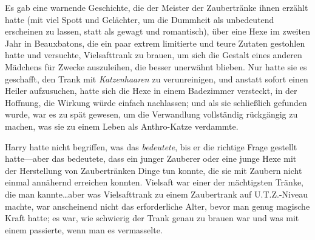 Es gab eine warnende Geschichte, die der Meister der Zaubertränke ihnen erzählt hatte (mit viel Spott und Gelächter, um die Dummheit als unbedeutend erscheinen zu lassen, statt als gewagt und romantisch), über eine Hexe im zweiten Jahr in Beauxbatons, die ein paar extrem limitierte und teure Zutaten gestohlen hatte und versuchte, Vielsafttrank zu brauen, um sich die Gestalt eines anderen Mädchens für Zwecke auszuleihen, die besser unerwähnt blieben. Nur hatte sie es geschafft, den Trank mit \emph{Katzenhaaren} zu verunreinigen, und anstatt sofort einen Heiler aufzusuchen, hatte sich die Hexe in einem Badezimmer versteckt, in der Hoffnung, die Wirkung würde einfach nachlassen; und als sie schließlich gefunden wurde, war es zu spät gewesen, um die Verwandlung vollständig rückgängig zu machen, was sie zu einem Leben als Anthro-Katze verdammte.

Harry hatte nicht begriffen, was das \emph{bedeutete}, bis er die richtige Frage gestellt hatte—aber das bedeutete, dass ein junger Zauberer oder eine junge Hexe mit der Herstellung von Zaubertränken Dinge tun konnte, die sie mit Zaubern nicht einmal annähernd erreichen konnten. Vielsaft war einer der mächtigsten Tränke, die man kannte…aber was Vielsafttrank zu einem Zaubertrank auf U.T.Z.-Niveau machte, war anscheinend nicht das erforderliche Alter, bevor man genug magische Kraft hatte; es war, wie schwierig der Trank genau zu brauen war und was mit einem passierte, wenn man es vermasselte.

